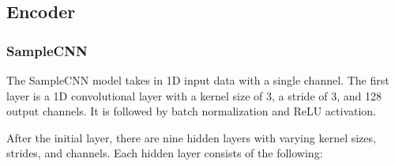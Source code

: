 \subsection{Encoder}
\subsubsection{SampleCNN}

The SampleCNN model \cite{CLMR2021} takes in 1D input data with a single channel. The first layer is a 1D convolutional layer with a kernel size of 3, a stride of 3, and 128 output channels. It is followed by batch normalization and ReLU activation.

After the initial layer, there are nine hidden layers with varying kernel sizes, strides, and channels. Each hidden layer consists of the following:

